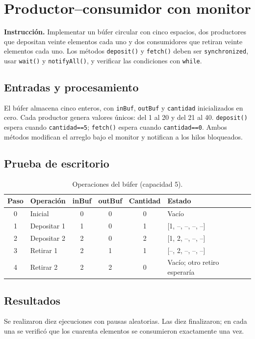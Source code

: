 \documentclass[12pt,oneside]{book}
\begin{document}
\frontmatter
\tableofcontents
\listoffigures
\listoftables
\mainmatter

\chapter{Productor--consumidor con monitor}
\textbf{Instrucción.} Implementar un búfer circular con cinco espacios, dos productores que depositan veinte elementos cada uno y dos consumidores que retiran veinte elementos cada uno. Los métodos \texttt{deposit()} y \texttt{fetch()} deben ser \texttt{synchronized}, usar \texttt{wait()} y \texttt{notifyAll()}, y verificar las condiciones con \texttt{while}.

\section{Entradas y procesamiento}
El búfer almacena cinco enteros, con \texttt{inBuf}, \texttt{outBuf} y \texttt{cantidad} inicializados en cero. Cada productor genera valores únicos: del 1 al 20 y del 21 al 40. \texttt{deposit()} espera cuando \texttt{cantidad==5}; \texttt{fetch()} espera cuando \texttt{cantidad==0}. Ambos métodos modifican el arreglo bajo el monitor y notifican a los hilos bloqueados.

\section{Prueba de escritorio}
\begin{table}[H]\centering\caption{Operaciones del búfer (capacidad 5).}
\begin{tabularx}{\textwidth}{c X c c c X}\toprule
Paso & Operación & inBuf & outBuf & Cantidad & Estado\\\midrule
0 & Inicial & 0 & 0 & 0 & Vacío\\
1 & Depositar 1 & 1 & 0 & 1 & [1, --, --, --, --]\\
2 & Depositar 2 & 2 & 0 & 2 & [1, 2, --, --, --]\\
3 & Retirar 1 & 2 & 1 & 1 & [--, 2, --, --, --]\\
4 & Retirar 2 & 2 & 2 & 0 & Vacío; otro retiro esperaría\\\bottomrule
\end{tabularx}\end{table}

\section{Resultados}
Se realizaron diez ejecuciones con pausas aleatorias. Las diez finalizaron; en cada una se verificó que los cuarenta elementos se consumieron exactamente una vez.
\end{document}
